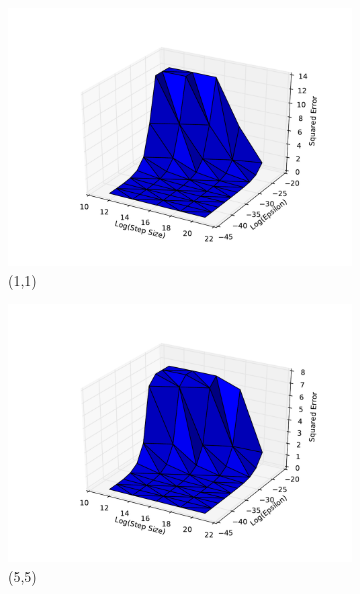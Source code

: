 \documentclass[psamsfonts]{amsart}
\theoremstyle{definition}
\theoremstyle{remark}
\numberwithin{equation}{section}
\begin{document}
\begin{figure}
	\centering
	\begin{subfigure}[b]{0.45\textwidth}
	\includegraphics[width=\textwidth]{hw1_1-1_0.pdf}
	\caption{(1,1)}
	\end{subfigure}
\begin{subfigure}[b]{0.45\textwidth}
	\includegraphics[width=\textwidth]{hw1_1-1_1.pdf}
	\caption{(5,5)}
\end{subfigure}
\begin{subfigure}[b]{0.45\textwidth}

\end{subfigure}
\end{figure}
\end{document}
